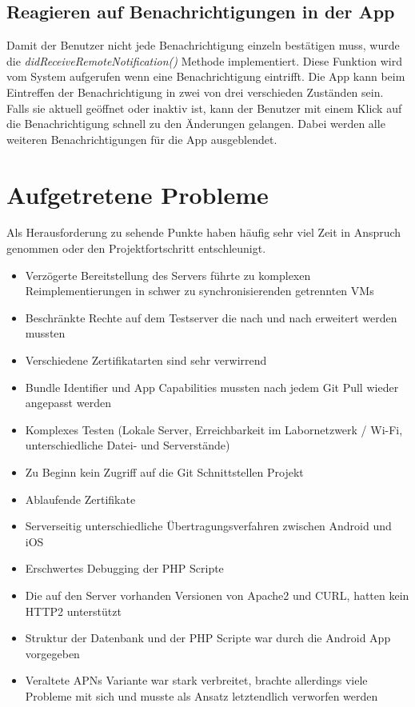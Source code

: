 \newpage

\subsection{Reagieren auf Benachrichtigungen in der App}
Damit der Benutzer nicht jede Benachrichtigung einzeln bestätigen muss, wurde die \textit{didReceiveRemoteNotification()} Methode implementiert. Diese Funktion wird vom System aufgerufen wenn eine Benachrichtigung eintrifft. Die App kann beim Eintreffen der Benachrichtigung in zwei von drei verschieden Zuständen sein. Falls sie aktuell geöffnet oder inaktiv ist, kann der Benutzer mit einem Klick auf die Benachrichtigung schnell zu den Änderungen gelangen. 
Dabei werden alle weiteren Benachrichtigungen für die App ausgeblendet.
\\



\newpage

\section{Aufgetretene Probleme}
Als Herausforderung zu sehende Punkte haben häufig sehr viel Zeit in Anspruch genommen oder den Projektfortschritt entschleunigt.


\begin{itemize}
\item Verzögerte Bereitstellung des Servers führte zu komplexen Reimplementierungen in schwer zu synchronisierenden getrennten VMs
\item Beschränkte Rechte auf dem Testserver die nach und nach erweitert werden mussten
\item Verschiedene Zertifikatarten sind sehr verwirrend
\item Bundle Identifier und App Capabilities mussten nach jedem Git Pull wieder angepasst werden
\item Komplexes Testen (Lokale Server, Erreichbarkeit im Labornetzwerk / Wi-Fi, unterschiedliche Datei- und Serverstände) 
\item Zu Beginn kein Zugriff auf die Git Schnittstellen Projekt
\item Ablaufende Zertifikate
\item Serverseitig unterschiedliche Übertragungsverfahren zwischen Android und iOS
\item Erschwertes Debugging der PHP Scripte
\item Die auf den Server vorhanden Versionen von Apache2 und CURL, hatten kein HTTP2 unterstützt  
\item Struktur der Datenbank und der PHP Scripte war durch die Android App vorgegeben
\item Veraltete APNs Variante war stark verbreitet, brachte allerdings viele Probleme mit sich und musste als Ansatz letztendlich verworfen werden
\end{itemize}


